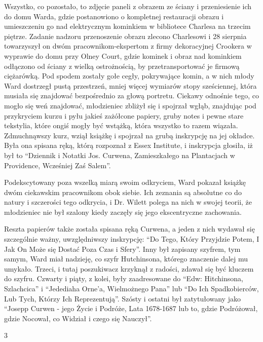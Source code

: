 Wszystko, co pozostało, to zdjęcie paneli z obrazem ze ściany i przeniesienie ich do domu Warda, gdzie postanowiono o kompletnej restauracji obrazu i umieszczeniu go nad elektrycznym kominkiem w bibliotece Charlesa na trzecim piętrze. Zadanie nadzoru przenoszenie obrazu zlecono Charlesowi i 28 sierpnia towarzyszył on dwóm pracownikom-ekspertom z firmy dekoracyjnej Crookera w wyprawie do domu przy Olney Court, gdzie kominek i obraz nad kominkiem odłączono od ściany z wielką ostrożnością, by przetransportować je firmową ciężarówką. Pod spodem zostały gołe cegły, pokrywające komin, a w nich młody Ward  dostrzegł pustą przestrzeń, mniej więcej wymiarów stopy sześciennej, która musiała się znajdować bezpośrednio za głową portretu. Ciekawy odnośnie tego, co mogło się weń znajdować, młodzieniec zbliżył się i spojrzał wgłąb, znajdując pod przykryciem kurzu i pyłu jakieś zażółcone papiery, gruby notes i pewne stare tekstylia, które ongiś mogły być wstążką, która wszystko to razem wiązała. Zdmuchnąwszy kurz, wziął książkę i spojrzał na grubą inskrypcję na jej okładce. Była ona spisana ręką, którą rozpoznał z Essex Institute, i inskrypcja głosiła, iż był to ``Dziennik i Notatki Jos. Curwena, Zamieszkałego na Plantacjach w Providence, Wcześniej Zaś Salem''.

Podekscytowany poza wszelką miarą swoim odkryciem, Ward pokazał książkę dwóm ciekawskim pracownikom obok siebie. Ich zeznania są absolutne co do natury i szczerości tego odkrycia, i Dr. Wilett polega na nich w swojej teorii, że młodzieniec nie był szalony kiedy zaczęły się jego ekscentryczne zachowania. 

Reszta papierów także została spisana ręką Curwena, a jeden z nich wydawał się szczególnie ważny, uwzględniwszy inskrypcję: ``Do Tego, Który Przyjdzie Potem, I Jak On Może się Dostać Poza Czas i Sfery''. Inny był zapisany szyfrem, tym samym, Ward miał nadzieję, co szyfr Hutchinsona, którego znaczenie dalej mu umykało. Trzeci, i tutaj poszukiwacz krzyknął z radości, zdawał się być kluczem do szyfru. Czwarty i piąty, z kolei, były zaadresowane do ``Edw: Hitchinsona, Szlachcica'' i ``Jedediaha Orne'a, Wielmożnego Pana'' lub ``Do Ich Spadkobierców, Lub Tych, Którzy Ich Reprezentują''. Szósty i ostatni był zatytułowany jako ``Josepp Curwen - jego Życie i Podróże, Lata 1678-1687 lub to, gdzie Podróżował, gdzie Nocował, co Widział i czego się Nauczył''. 

\begin{center}
3
\end{center}

